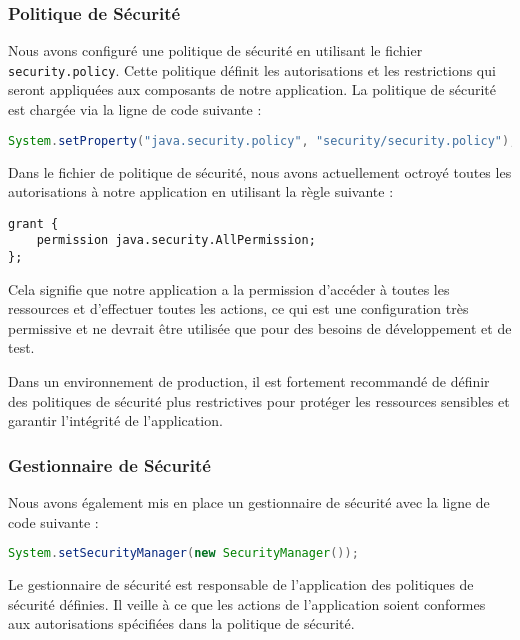 \documentclass{article} %
\begin{document}
\subsubsection{Politique de Sécurité}

\begin{sloppypar}
    Nous avons configuré une politique de sécurité en utilisant le fichier \texttt{security.policy}. Cette politique définit les autorisations et les restrictions qui seront appliquées aux composants de notre application. La politique de sécurité est chargée via la ligne de code suivante :
\end{sloppypar}

\begin{lstlisting}[language=Java]
System.setProperty("java.security.policy", "security/security.policy");
\end{lstlisting}


Dans le fichier de politique de sécurité, nous avons actuellement octroyé toutes les autorisations à notre application en utilisant la règle suivante :

\begin{lstlisting}
grant {
    permission java.security.AllPermission;
};
\end{lstlisting}

Cela signifie que notre application a la permission d'accéder à toutes les ressources et d'effectuer toutes les actions, ce qui est une configuration très permissive et ne devrait être utilisée que pour des besoins de développement et de test.

Dans un environnement de production, il est fortement recommandé de définir des politiques de sécurité plus restrictives pour protéger les ressources sensibles et garantir l'intégrité de l'application.

\subsubsection{Gestionnaire de Sécurité}

Nous avons également mis en place un gestionnaire de sécurité avec la ligne de code suivante :

\begin{lstlisting}[language=Java]
System.setSecurityManager(new SecurityManager());
\end{lstlisting}

Le gestionnaire de sécurité est responsable de l'application des politiques de sécurité définies. Il veille à ce que les actions de l'application soient conformes aux autorisations spécifiées dans la politique de sécurité.
\end{document}
